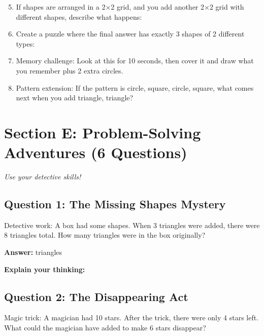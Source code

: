 \documentclass{article}
\begin{document}
\begin{enumerate}
    \setcounter{enumi}{4}
    \item If shapes are arranged in a 2×2 grid, and you add another 2×2 grid with different shapes, describe what happens: \\
          \underline{\hspace{8cm}}
    
    \item Create a puzzle where the final answer has exactly 3 shapes of 2 different types: \\
          \underline{\hspace{8cm}}
    
    \item Memory challenge: Look at this for 10 seconds, then cover it and draw what you remember plus 2 extra circles.
    
    \item Pattern extension: If the pattern is circle, square, circle, square, what comes next when you add triangle, triangle? \\
          \underline{\hspace{6cm}}
\end{enumerate}

\section{Section E: Problem-Solving Adventures (6 Questions)}
\textit{Use your detective skills!}

\subsection*{Question 1: The Missing Shapes Mystery}
Detective work: A box had some shapes. When 3 triangles were added, there were 8 triangles total. How many triangles were in the box originally?

\textbf{Answer:} \underline{\hspace{3cm}} triangles

\textbf{Explain your thinking:} \underline{\hspace{6cm}}

\subsection*{Question 2: The Disappearing Act}
Magic trick: A magician had 10 stars. After the trick, there were only 4 stars left. What could the magician have added to make 6 stars disappear?
\end{document}
